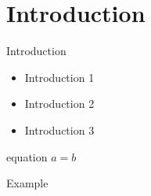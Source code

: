 \section{Introduction}

\begin{frame}{Introduction}
	\begin{itemize}
		\item Introduction 1
		\item Introduction 2
		\item Introduction 3
	\end{itemize}
\end{frame}

\begin{tcboutputlisting}
	\begin{frame}{equation}
	$a =  b$
	\end{frame}
\end{tcboutputlisting}

\begin{frame}[fragile]{Example}
\end{frame}